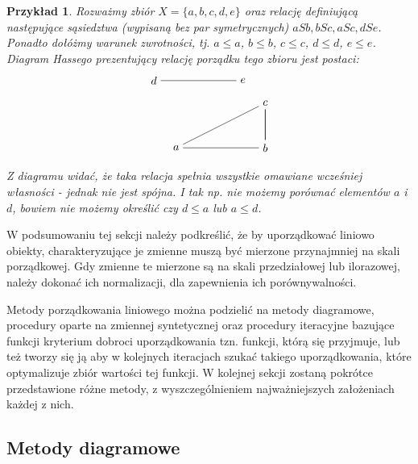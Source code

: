 \documentclass[12pt,a4paper]{report}
\newtheorem{example}{Przykład}
\begin{document}
\begin{example}
Rozważmy zbiór $X = \{a,b,c,d,e \}$ oraz relację definiującą następujące sąsiedztwa (wypisaną bez par symetrycznych) $aSb, bSc, aSc, dSe$. Ponadto dołóżmy warunek zwrotności, tj. $a \leq a$, $b \leq b$, $c \leq c$, $d \leq d$, $e \leq e$. 
\newline
Diagram Hassego prezentujący relację porządku tego zbioru jest postaci:
$$
\begin{tikzpicture}[scale=.7]
  \node (a) at (-2,0) {$a$};
  \node (b) at (2,0) {$b$};
  \node (c) at (2,2) {$c$};
 \node (e) at (1,3) {$e$};
 \node (d) at (-3,3) {$d$};
  \draw (b)--(a) --(c)-- (b) -- (c); %
  \draw (d)--(e);
\end{tikzpicture}
$$
Z diagramu widać, że taka relacja spełnia wszystkie omawiane wcześniej własności - jednak nie jest spójna. I tak np. nie możemy porównać elementów $a$ i $d$, bowiem nie możemy określić czy  $d \leq a$ lub $a \leq d$.
\end{example}



W podsumowaniu tej sekcji należy podkreślić, że by uporządkować liniowo obiekty, charakteryzujące je zmienne muszą być mierzone przynajmniej na skali porządkowej. Gdy zmienne te mierzone są na skali przedziałowej lub ilorazowej, należy dokonać ich normalizacji, dla zapewnienia ich porównywalności.

Metody porządkowania liniowego można podzielić na metody diagramowe, procedury oparte na zmiennej syntetycznej oraz procedury iteracyjne bazujące funkcji kryterium dobroci uporządkowania tzn. funkcji, którą się przyjmuje, lub też tworzy się ją aby w kolejnych iteracjach szukać takiego uporządkowania, które optymalizuje zbiór wartości tej funkcji. W kolejnej sekcji zostaną pokrótce przedstawione różne metody, z wyszczególnieniem najważniejszych założeniach każdej z nich.

\newpage
\subsection{Metody diagramowe}
\noindent
\end{document}
